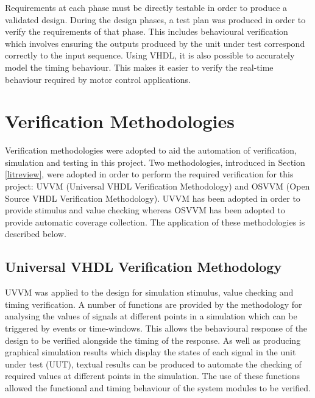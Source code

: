Requirements at each phase must be directly testable in order to produce a validated design. During the design phases, a test plan was produced in order to verify the requirements of that phase. This includes behavioural verification which involves ensuring the outputs produced by the unit under test correspond correctly to the input sequence. Using VHDL, it is also possible to accurately model the timing behaviour. This makes it easier to verify the real-time behaviour required by motor control applications.


\section{Verification Methodologies}

Verification methodologies were adopted to aid the automation of verification, simulation and testing in this project. Two methodologies, introduced in Section \ref{litreview}, were adopted in order to perform the required verification for this project: UVVM (Universal VHDL Verification Methodology)\cite{uvvmref} and OSVVM (Open Source VHDL Verification Methodology)\cite{osvvmref}. UVVM has been adopted in order to provide stimulus and value checking whereas OSVVM has been adopted to provide automatic coverage collection. The application of these methodologies is described below.

\subsection{Universal VHDL Verification Methodology}

UVVM was applied to the design for simulation stimulus, value checking and timing verification. A number of functions are provided by the methodology for analysing the values of signals at different points in a simulation which can be triggered by events or time-windows. This allows the behavioural response of the design to be verified alongside the timing of the response. As well as producing graphical simulation results which display the states of each signal in the unit under test (UUT), textual results can be produced to automate the checking of required values at different points in the simulation. The use of these functions allowed the functional and timing behaviour of the system modules to be verified.

